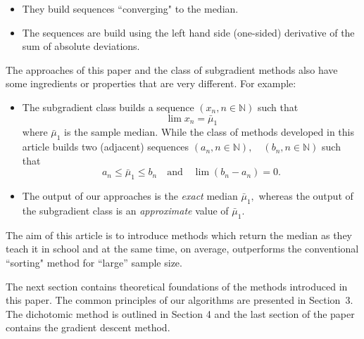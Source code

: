 \documentclass[
  11pt,
  a4paper,
]{article}
\newcommand\N{{\mathbb N}}
\begin{document}
\begin{itemize}
	\item[--] They build sequences ``converging" to the median.
	\item[--] The sequences are build using the left hand side (one-sided) derivative of the sum of absolute deviations.
\end{itemize}
The approaches of this paper and the class of subgradient methods also have some ingredients or properties that are very
different. For example:
\begin{itemize}
	\item[--] The subgradient class  builds  a sequence $(x_n,n\in \N)$ such that
	\[ \lim x_n=\bar{\mu}_1 \]
	where $\bar{\mu}_1$ is the sample median. While the class of methods developed in this article builds  two (adjacent)
	sequences $(a_n,n\in \N), \quad (b_n,n\in \N) $ such that 
	\[ a_n\leq \bar{\mu}_1 \leq b_n \quad \text{and}\quad \lim( b_n-a_n)=0.\]
	
	\item[--] The output of our approaches is the \textit{exact} median $\bar{\mu}_1,$ whereas the output of the subgradient class
	is an \textit{approximate} value of $\bar{\mu}_1.$
\end{itemize}
The aim of this
article is to introduce  methods which return the median as they  teach it in school and at the same time, on average,
outperforms the conventional ``sorting" method for ``large'' sample size.

The next section contains  theoretical foundations of the  methods introduced in this paper. The common principles of our algorithms
are presented in Section~3. The dichotomic method is outlined in Section 4 and the last section of the paper contains the gradient descent
method.
\end{document}
